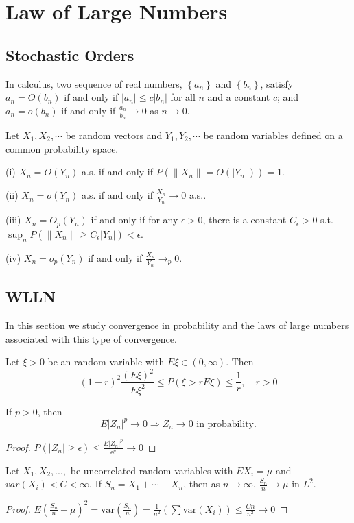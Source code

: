 \chapter{Law of Large Numbers}

\section{Stochastic Orders}
In calculus, two sequence of real numbers, $\left\{a_n\right\}$ and $\left\{b_n\right\}$, satisfy $a_n=O(b_n)$ if and only if $\left|a_n\right|\le c\left|b_n\right|$ for all $n$ and a constant $c$; and $a_n=o(b_n)$ if and only if $\frac{a_n}{b_n}\to 0$ as $n\to0$.
\begin{definition}
Let $X_1,X_2,\cdots$ be random vectors and $Y_1,Y_2,\cdots$ be random variables defined on a common probability space.\par
(i) $X_n=O(Y_n)$ a.s. if and only if $P(\left \| X_n \right \| =O(\left | Y_n \right | ))=1$.\par
(ii) $X_n=o(Y_n)$ a.s. if and only if $\frac{X_n}{Y_n}\to 0$ a.s..\par
(iii) $X_n=O_p(Y_n)$ if and only if for any $\epsilon>0$, there is a constant $C_\epsilon>0$ s.t. $\sup_nP(\left \| X_n \right \| \ge C_\epsilon \left | Y_n \right | )<\epsilon$.\par
(iv) $X_n=o_p(Y_n)$ if and only if $\frac{X_n}{Y_n}\to_p0$.
\end{definition}
\section{WLLN}
In this section we study convergence in probability and the laws of large numbers associated with this type of convergence.
\begin{lemma}
    Let $\xi>0$ be an random variable with $E\xi\in (0,\infty)$. Then 
    \[(1-r)^2\frac{(E\xi)^2}{E\xi^2}\le P(\xi>rE\xi)\le \frac{1}{r},\quad r>0\]
\end{lemma}
\begin{theorem}
If $p>0$, then \[E\left | Z_n \right | ^p\to 0 \Longrightarrow Z_n\longrightarrow 0\text{ in probability.}\]
\end{theorem}
\begin{proof}
$P(\left | Z_n \right |\ge\epsilon)\le\frac{E\left | Z_n \right | ^p}{\epsilon^p}\to 0$
\end{proof}
\begin{theorem}
Let $X_1,X_2,...,$ be uncorrelated random variables with $EX_i=\mu$ and $var(X_i)<C<\infty$. If $S_n=X_1+\cdots+X_n$, then as $n\to\infty$, $\frac{S_n}{n}\longrightarrow \mu$ in $L^2$.
\end{theorem}
\begin{proof}
$E(\frac{S_n}{n}-\mu)^2=\text{var}(\frac{S_n}{n})=\frac{1}{n^2}(\sum\text{var}(X_i))\le \frac{Cn}{n^2}\to 0$
\end{proof}

